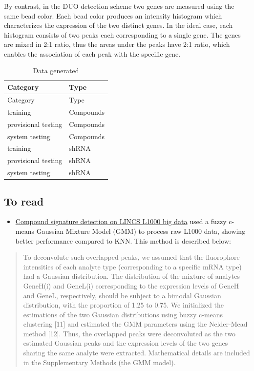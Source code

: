 \documentclass[]{article}
\providecommand{\tightlist}{%
  \setlength{\itemsep}{0pt}\setlength{\parskip}{0pt}}
\begin{document}
By contrast, in the DUO detection scheme two genes are measured using
the same bead color. Each bead color produces an intensity histogram
which characterizes the expression of the two distinct genes. In the
ideal case, each histogram consists of two peaks each corresponding to a
single gene. The genes are mixed in 2:1 ratio, thus the areas under the
peaks have 2:1 ratio, which enables the association of each peak with
the specific gene.

\begin{longtable}[]{@{}ll@{}}
\caption{Data generated}\tabularnewline
\toprule
Category & Type\tabularnewline
\midrule
\endfirsthead
\toprule
Category & Type\tabularnewline
\midrule
\endhead
training & Compounds\tabularnewline
provisional testing & Compounds\tabularnewline
system testing & Compounds\tabularnewline
training & shRNA\tabularnewline
provisional testing & shRNA\tabularnewline
system testing & shRNA\tabularnewline
\bottomrule
\end{longtable}

\hypertarget{to-read}{%
\subsection{To read}\label{to-read}}

\begin{itemize}
\tightlist
\item
  \href{https://pubs.rsc.org/en/content/getauthorversionpdf/c4mb00677a}{Compound
  signature detection on LINCS L1000 big data} used a fuzzy c-means
  Gaussian Mixture Model (GMM) to process raw L1000 data, showing better
  performance compared to KNN. This method is described below:
\end{itemize}

\begin{quote}
To deconvolute such overlapped peaks, we assumed that the fluorophore
intensities of each analyte type (corresponding to a specific mRNA type)
had a Gaussian distribution. The distribution of the mixture of analytes
GeneH(i) and GeneL(i) corresponding to the expression levels of GeneH
and GeneL, respectively, should be subject to a bimodal Gaussian
distribution, with the proportion of 1.25 to 0.75. We initialized the
estimations of the two Gaussian distributions using buzzy c-means
clustering {[}11{]} and estimated the GMM parameters using the
Nelder-Mead method {[}12{]}. Thus, the overlapped peaks were
deconvoluted as the two estimated Gaussian peaks and the expression
levels of the two genes sharing the same analyte were extracted.
Mathematical details are included in the Supplementary Methods (the GMM
model).
\end{quote}
\end{document}
